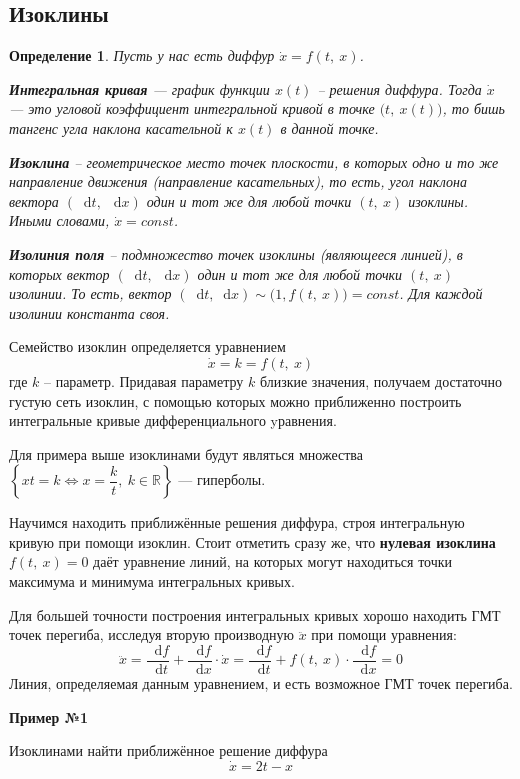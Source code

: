 \documentclass[a4paper,12pt]{article}
\newtheorem{definition}{Определение}
\newcommand{\R}{\mathbb{R}}
\renewcommand*\d{\mathop{}\!\mathrm{d}}
\newcommand{\dx}{\dot{x}}
\newcommand{\ddx}{\ddot{x}}
\begin{document}
\subsection{Изоклины}

\begin{definition}
	Пусть у нас есть диффур $\dx = f(t,\ x)$.
	
	\textbf{Интегральная кривая} --- график функции $x(t)$ -- решения диффура. Тогда $\dx$ --- это угловой коэффициент интегральной кривой в точке $\big(t,\ x(t)\big)$, то бишь тангенс угла наклона касательной к $x(t)$ в данной точке.
	
	\textbf{Изоклина} -- геометрическое место точек плоскости, в которых одно и то же направление движения (направление касательных), то есть, угол наклона вектора $(\d t,\ \d x)$ один и тот же для любой точки $(t,\ x)$ изоклины. Иными словами, $\dx = const$.
	
	\textbf{Изолиния поля} -- подмножество точек изоклины (являющееся линией), в которых вектор $(\d t,\ \d x)$ один и тот же для любой точки  $(t,\ x)$ изолинии. То есть, вектор $(\d t, \d x) \sim \big(1, f(t,\ x)\big) = const$. Для каждой изолинии константа своя.
\end{definition}

Семейство изоклин определяется уравнением
\[\dx = k = f(t,\ x)\] где $k$ -- параметр. Придавая параметру $k$ близкие значения, получаем достаточно густую сеть изоклин, с помощью которых можно приближенно построить интегральные кривые дифференциального yравнения.

Для примера выше изоклинами будут являться множества $\left\{xt = k \iff x = \dfrac{k}{t},\ k \in \R\right\}$ --- гиперболы.

Научимся находить приближённые решения диффура, строя интегральную кривую при помощи изоклин. Стоит отметить сразу же, что \textbf{нулевая изоклина} $f(t,\ x) = 0$ даёт уравнение линий, на которых могут находиться точки максимума и минимума интегральных кривых.

Для большей точности построения интегральных кривых хорошо находить ГМТ точек перегиба, исследуя вторую производную $\ddx$ при помощи уравнения:
\[\ddx = \dfrac{\d f}{\d t} + \dfrac{\d f}{\d x}\cdot \dx = \dfrac{\d f}{\d t} + f(t,\ x) \cdot \dfrac{\d f}{\d x} = 0\]
Линия, определяемая данным уравнением, и есть возможное ГМТ точек перегиба.

\textbf{Пример №1}

Изоклинами найти приближённое решение диффура
\[\dx = 2t - x\]
\end{document}
